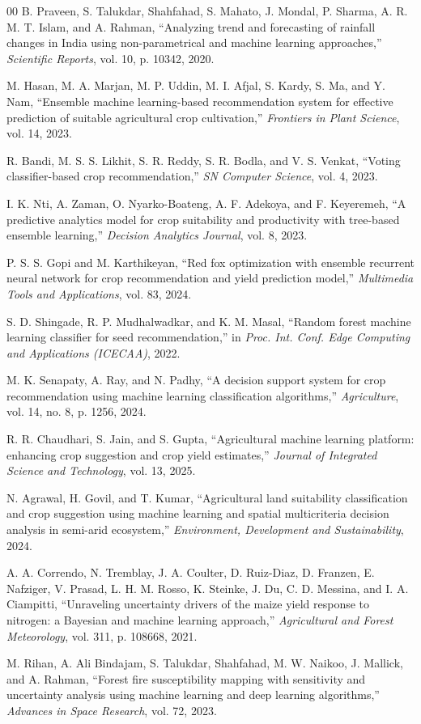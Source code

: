 \documentclass[conference]{IEEEtran}
\begin{document}
\begin{thebibliography}{00}
 B. Praveen, S. Talukdar, Shahfahad, S. Mahato, J. Mondal,
P. Sharma, A. R. M. T. Islam, and A. Rahman, ``Analyzing trend and forecasting of
rainfall changes in India using non-parametrical and machine learning approaches,''
\emph{Scientific Reports}, vol. 10, p. 10342, 2020.

 M. Hasan, M. A. Marjan, M. P. Uddin, M. I. Afjal, S. Kardy, S. Ma,
and Y. Nam, ``Ensemble machine learning-based recommendation system for effective
prediction of suitable agricultural crop cultivation,'' \emph{Frontiers in Plant
Science}, vol. 14, 2023.

 R. Bandi, M. S. S. Likhit, S. R. Reddy, S. R. Bodla, and
V. S. Venkat, ``Voting classifier-based crop recommendation,'' \emph{SN Computer
Science}, vol. 4, 2023.

 I. K. Nti, A. Zaman, O. Nyarko-Boateng, A. F. Adekoya, and
F. Keyeremeh, ``A predictive analytics model for crop suitability and productivity
with tree-based ensemble learning,'' \emph{Decision Analytics Journal}, vol. 8, 2023.

 P. S. S. Gopi and M. Karthikeyan, ``Red fox optimization with
ensemble recurrent neural network for crop recommendation and yield prediction
model,'' \emph{Multimedia Tools and Applications}, vol. 83, 2024.

 S. D. Shingade, R. P. Mudhalwadkar, and K. M. Masal, ``Random
forest machine learning classifier for seed recommendation,'' in \emph{Proc. Int.
Conf. Edge Computing and Applications (ICECAA)}, 2022.

 M. K. Senapaty, A. Ray, and N. Padhy, ``A decision support
system for crop recommendation using machine learning classification algorithms,''
\emph{Agriculture}, vol. 14, no. 8, p. 1256, 2024.

 R. R. Chaudhari, S. Jain, and S. Gupta, ``Agricultural
machine learning platform: enhancing crop suggestion and crop yield estimates,''
\emph{Journal of Integrated Science and Technology}, vol. 13, 2025.

 N. Agrawal, H. Govil, and T. Kumar, ``Agricultural land
suitability classification and crop suggestion using machine learning and spatial
multicriteria decision analysis in semi-arid ecosystem,'' \emph{Environment,
Development and Sustainability}, 2024.

 A. A. Correndo, N. Tremblay, J. A. Coulter, D. Ruiz-Diaz,
D. Franzen, E. Nafziger, V. Prasad, L. H. M. Rosso, K. Steinke, J. Du, C. D. Messina,
and I. A. Ciampitti, ``Unraveling uncertainty drivers of the maize yield response to
nitrogen: a Bayesian and machine learning approach,'' \emph{Agricultural and Forest
Meteorology}, vol. 311, p. 108668, 2021.

 M. Rihan, A. Ali Bindajam, S. Talukdar, Shahfahad,
M. W. Naikoo, J. Mallick, and A. Rahman, ``Forest fire susceptibility mapping with
sensitivity and uncertainty analysis using machine learning and deep learning
algorithms,'' \emph{Advances in Space Research}, vol. 72, 2023.

\end{thebibliography}
\end{document}
